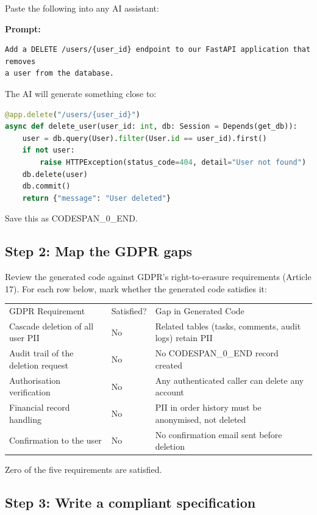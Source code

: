 \documentclass[11pt,a4paper]{book}
\begin{document}
Paste the following into any AI assistant:

\textbf{Prompt:}
\begin{lstlisting}
Add a DELETE /users/{user_id} endpoint to our FastAPI application that removes
a user from the database.
\end{lstlisting}

The AI will generate something close to:

\begin{lstlisting}[language=Python]
@app.delete("/users/{user_id}")
async def delete_user(user_id: int, db: Session = Depends(get_db)):
    user = db.query(User).filter(User.id == user_id).first()
    if not user:
        raise HTTPException(status_code=404, detail="User not found")
    db.delete(user)
    db.commit()
    return {"message": "User deleted"}
\end{lstlisting}

Save this as CODESPAN\_0\_END.

\subsection{Step 2: Map the GDPR gaps}

Review the generated code against GDPR's right-to-erasure requirements (Article 17). For each row below, mark whether the generated code satisfies it:

\begin{tabular}{lll}
\hline
GDPR Requirement & Satisfied? & Gap in Generated Code \\
Cascade deletion of all user PII & No & Related tables (tasks, comments, audit logs) retain PII \\
Audit trail of the deletion request & No & No CODESPAN\_0\_END record created \\
Authorisation verification & No & Any authenticated caller can delete any account \\
Financial record handling & No & PII in order history must be anonymised, not deleted \\
Confirmation to the user & No & No confirmation email sent before deletion \\
\hline
\end{tabular}

Zero of the five requirements are satisfied.

\subsection{Step 3: Write a compliant specification}
\end{document}
